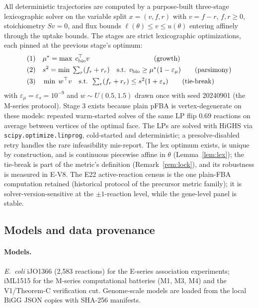 \documentclass[11pt,a4paper]{article}
\theoremstyle{plain}
\theoremstyle{definition}
\theoremstyle{remark}
\begin{document}
All deterministic trajectories are computed by a purpose-built
three-stage lexicographic solver on the variable split $x = (v, f,
r)$ with $v = f - r$, $f, r \ge 0$, stoichiometry $Sv = 0$, and
flux bounds $\ell(\theta) \le v \le u(\theta)$ entering affinely
through the uptake bounds. The stages are strict lexicographic
optimizations, each pinned at the previous stage's optimum:
\begin{align}
\text{(1)}\quad & \mu^* = \max\; c_{\mathrm{bio}}^\top v
  \qquad\qquad\qquad\qquad\quad\; \text{(growth)} \notag\\
\text{(2)}\quad & s^2 = \min\; \textstyle\sum_r (f_r + r_r)
  \quad\text{s.t. } v_{\mathrm{bio}} \ge \mu^*(1 - \varepsilon_\mu)
  \qquad \text{(parsimony)} \notag\\
\text{(3)}\quad & \min\; w^\top v
  \quad\text{s.t. } \textstyle\sum_r (f_r + r_r) \le s^2(1 +
  \varepsilon_s) \qquad \text{(tie-break)} \notag
\end{align}
with $\varepsilon_\mu = \varepsilon_s = 10^{-9}$ and $w \sim
U(0.5, 1.5)$ drawn once with seed 20240901 (the M-series protocol).
Stage 3 exists because plain pFBA is vertex-degenerate on these
models: repeated warm-started solves of the same LP flip $0.69$
reactions on average between vertices of the optimal face. The LPs
are solved with HiGHS
\citep{huangfu2018} via \texttt{scipy.optimize.linprog}, cold-started
and deterministic; a presolve-disabled retry handles the rare
infeasibility mis-report. The lex optimum exists, is unique by
construction, and is continuous piecewise affine in $\theta$
(Lemma~\ref{lem:lex}); the tie-break is part of the metric's
definition (Remark~\ref{rem:lock}), and its robustness is measured
in E-V8. The E22 active-reaction census is the one plain-FBA
computation retained (historical protocol of the precursor metric
family); it is solver-version-sensitive at the $\pm 1$-reaction
level, while the gene-level panel is stable.

\subsection{Models and data provenance}\label{sec:data}

\paragraph{Models.} \emph{E.~coli} iJO1366 (2{,}583 reactions)
\citep{orth2011} for the E-series association experiments; iML1515
\citep{monk2017} for the M-series computational batteries (M1, M3,
M4) and the V1/Theorem-C verification cut. Genome-scale models are
loaded from the local BiGG JSON copies with SHA-256 manifests.
\end{document}
